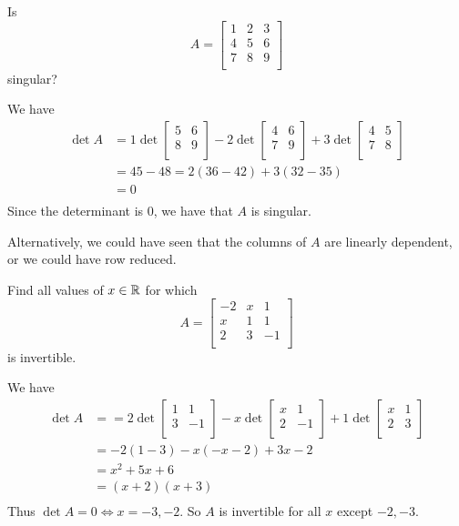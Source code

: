\documentclass{article}
\begin{document}
\begin{example}
  Is \[
    A =
    \begin{bmatrix}
      1 & 2 & 3\\
      4 & 5 & 6\\
      7 & 8 & 9\\
    \end{bmatrix}
  \] singular?

  We have
  \begin{align*}
    \det A &= 1 \det
    \begin{bmatrix}
      5 & 6\\
      8 & 9\\
    \end{bmatrix} - 2 \det
    \begin{bmatrix}
      4 & 6\\
      7 & 9\\
    \end{bmatrix} + 3 \det
    \begin{bmatrix}
      4 & 5\\
      7 & 8\\
    \end{bmatrix}\\
    &= 45 - 48 = 2(36 - 42) + 3(32 - 35)\\
    &= 0\\
  \end{align*}
  Since the determinant is $0$, we have that $A$ is singular.

  Alternatively, we could have seen that the columns of $A$ are linearly dependent, or we could have row reduced.
\end{example}
\begin{example}
  Find all values of $x \in \mathbb{R}$ for which \[
    A =
    \begin{bmatrix}
      -2 & x & 1\\
      x & 1 & 1\\
      2 & 3 & -1\\
    \end{bmatrix}
  \] is invertible.

  We have
  \begin{align*}
    \det A &= =2\det
    \begin{bmatrix}
      1 & 1\\
      3 & -1\\
    \end{bmatrix} - x\det
    \begin{bmatrix}
      x & 1\\
      2 & -1\\
    \end{bmatrix} + 1\det
    \begin{bmatrix}
      x & 1\\
      2 & 3\\
    \end{bmatrix}\\
    &= -2(1-3) - x(-x - 2) + 3x - 2\\
    &= x^2 + 5x + 6\\
    &= (x+2)(x+3)\\
  \end{align*}
  Thus $\det A = 0 \iff x = -3, -2$. So $A$ is invertible for all $x$ except $-2, -3$.
\end{example}
\end{document}
